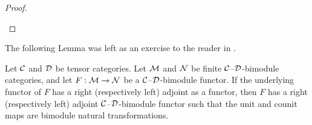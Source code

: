 \documentclass{amsart}
\begin{document}
\begin{proof}
\begin{center}
\end{center}
\end{proof}

The following Lemma was left as an exercise to the reader in \cite[\S 3.3]{EO-ftc}.

\begin{lemma} \label{lma:module-adjoint}
Let $\mathcal C$ and $\mathcal D$ be tensor categories. Let  $\mathcal M$ and  $\mathcal N$  be finite $\mathcal C$--$\mathcal D$-bimodule categories, and let $F: \mathcal M \to \mathcal N$ be a $\mathcal C$--$\mathcal D$-bimodule functor.  If the underlying functor of $F$ has a right (respectively left) adjoint as a functor, then $F$ has a right (respectively left) adjoint $\mathcal C$--$\mathcal D$-bimodule functor such that the unit and counit maps are bimodule natural transformations.   
\end{lemma}
\end{document}
